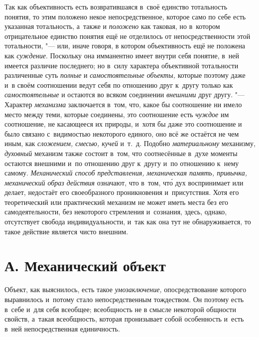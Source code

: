 Так как объективность есть возвратившаяся в~своё единство
тотальность понятия, то этим положено некое непосредственное, которое само
по себе есть указанная тотальность, а~также и {\em положено} как
таковая, но в~котором отрицательное единство понятия ещё не отделилось от
непосредственности этой тотальности, "--- или, иначе говоря, в
котором объективность ещё не положена как {\em суждение}. Поскольку
она имманентно имеет внутри себя понятие, в~ней имеется различие
последнего; но в~силу характера объективной тотальности различенные суть
{\em полные} и {\em самостоятельные объекты,}
которые поэтому даже и~в своём соотношении ведут себя по
отношению друг к~другу только как {\em самостоятельные} и
остаются во всяком соединении {\em внешними} друг другу. "--- Характер
{\em механизма} заключается в~том, что, какое бы соотношение ни имело место
между теми, которые соединены, это соотношение есть {\em чуждое} им
соотношение, не касающееся их природы, и~хотя бы даже это соотношение и
было связано с~видимостью некоторого единого, оно всё же остаётся не чем
иным, как {\em сложением, смесью, кучей} и~т.~д. Подобно {\em материальному}
механизму, {\em духовный}
механизм также состоит в~том, что соотнесённые в~духе моменты
остаются внешними и~по отношению друг к~другу и~по отношению к~нему самому.
{\em Механический способ представления, механическая память,
привычка, механический образ действия} означают, что в~том,
чт\'{о} дух воспринимает или делает, недостаёт его
своеобразного проникновения и~присутствия. Хотя его
теоретический или практический механизм не может иметь места без его
самодеятельности, без некоторого стремления и~сознания, здесь, однако,
отсутствует свобода индивидуальности, и~так как она тут не обнаруживается,
то такое действие является чисто внешним.

\section[А. Механический объект]{А. Механический объект}

Объект, как выяснилось, есть такое {\em умозаключение,}
опосредствование которого выравнилось и~потому стало непосредственным
тождеством. Он поэтому есть в~себе и~для себя всеобщее; всеобщность не в
смысле некоторой общности свойств, а~такая всеобщность, которая пронизывает
собой особенность и~есть в~ней непосредственная единичность.


